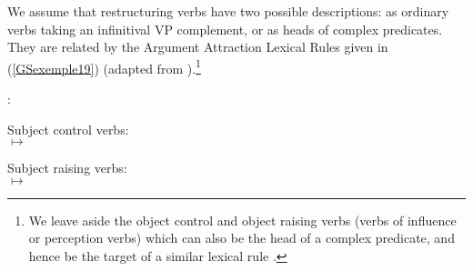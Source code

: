 	\label{GSexemple18b}
\zl

We assume that restructuring verbs have two possible descriptions: as ordinary verbs taking an infinitival VP complement, or as heads of complex predicates. They are related by the Argument Attraction Lexical Rules given in (\ref{GSexemple19}) (adapted from \citealt[331]{Monachesi98a}).\footnote{We leave aside the object control and object raising verbs (verbs of influence or perception verbs) which can also be the head of a complex predicate, and hence be the target of a similar lexical rule \citep{AGMS98a, AG2010}.}  

\begin{exe}
:\label{GSexemple19} 
\begin{xlist}
\ex
\label{GSexemple19a}Subject control verbs:\\
		$\mapsto$ \\\smallskip
\begin{flushright}
\end{flushright}
\ex
\label{GSexemple19b}
Subject raising verbs:\\
		$\mapsto$ \\\smallskip
\flushright{}
\end{xlist}
\end{exe}

